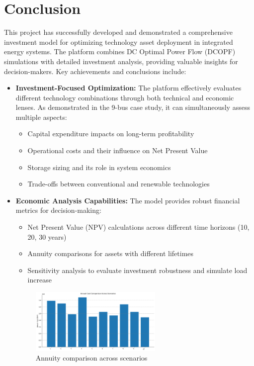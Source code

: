 \newpage
\section{Conclusion}

This project has successfully developed and demonstrated a comprehensive investment model for optimizing 
technology asset deployment in integrated energy systems. The platform combines DC Optimal Power Flow (DCOPF) 
simulations with detailed investment analysis, providing valuable insights for decision-makers. Key 
achievements and conclusions include:

\begin{itemize}
    \item \textbf{Investment-Focused Optimization:} The platform effectively evaluates different technology 
    combinations through both technical and economic lenses. As demonstrated in the 9-bus case study, it can 
    simultaneously assess multiple aspects:
    \begin{itemize}
        \item Capital expenditure impacts on long-term profitability
        \item Operational costs and their influence on Net Present Value
        \item Storage sizing and its role in system economics
        \item Trade-offs between conventional and renewable technologies
    \end{itemize}
    
    \item \textbf{Economic Analysis Capabilities:} The model provides robust financial metrics for decision-making:
    \begin{itemize}
        \item Net Present Value (NPV) calculations across different time horizons (10, 20, 30 years)
        \item Annuity comparisons for assets with different lifetimes
        \item Sensitivity analysis to evaluate investment robustness and simulate load increase
    \end{itemize}

    \begin{figure}[H]
        \centering
        \includegraphics[width=0.6\textwidth]{images/global.png}
        \caption{Annuity comparison across scenarios}
        \label{fig:global_annuities}
    \end{figure}


\end{itemize}

